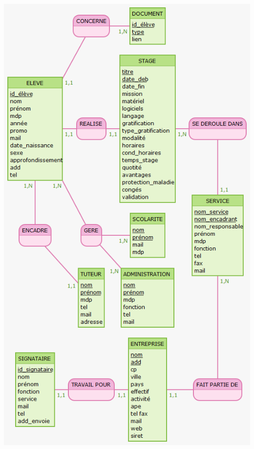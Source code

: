 \documentclass{scrreprt}
\begin{document}
\includegraphics[height=0.9\textheight]{"Stages"}
\end{document}

